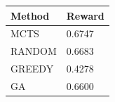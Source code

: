 \begin{tabular}{ll}
\hline
Method & Reward \\
\hline
  MCTS & 0.6747 \\
  RANDOM & 0.6683 \\
  GREEDY & 0.4278 \\
  GA & 0.6600 \\
\hline
\end{tabular}
